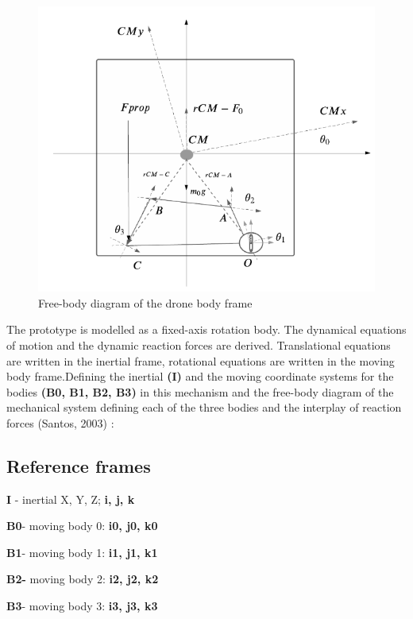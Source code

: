 \begin{figure}[h!]
  \centering
  \includegraphics[scale=0.8]{graphics/DroneFBD.png}
  \caption{Free-body diagram of the drone body frame}
  \label{fig:Free-body diagram of the drone body frame}
\end{figure}



The prototype is modelled as a fixed-axis rotation body. The dynamical equations of motion and the dynamic reaction forces are derived. Translational equations are written in the inertial frame, rotational equations are written in the moving body frame.Defining the inertial\textbf{ (I) }and the moving coordinate systems for the bodies \textbf{(B0, B1, B2, B3) }in this mechanism and the free-body diagram of the mechanical system defining each of the three bodies and the interplay of reaction forces (Santos, 2003) \cite{santos2001dinamica}:

\subsection{Reference frames}


\textbf{I} - inertial X, Y, Z;\textbf{ i, j, k}

\textbf{B0}- moving body 0:\textbf{ i0, j0, k0 }

\textbf{B1}- moving body 1:\textbf{ i1, j1, k1 }

\textbf{B2-} moving body 2: \textbf{i2, j2, k2}

\textbf{B3}- moving body 3:\textbf{ i3, j3, k3 }






